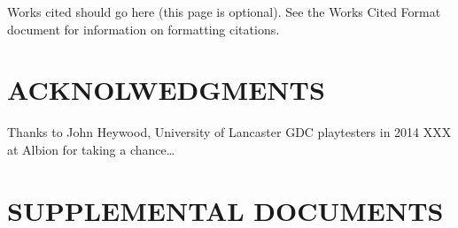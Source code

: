 Works cited should go here (this page is optional). See the Works Cited Format document for information on formatting citations.


\backmatter
\printindex
\printbibliography



\pagebreak 

\chapter{ACKNOLWEDGMENTS}
\label{acknolwedgments}

Thanks to John Heywood, University of Lancaster
GDC playtesters in 2014
XXX at Albion for taking a chance…

\pagebreak 

\chapter{SUPPLEMENTAL DOCUMENTS}
\label{supplementaldocuments}


